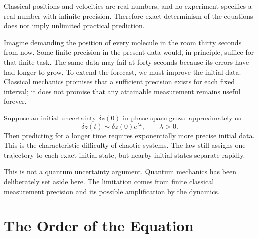 Classical positions and velocities are real numbers, and no experiment specifies a real number with infinite precision. Therefore exact determinism of the equations does not imply unlimited practical prediction.

Imagine demanding the position of every molecule in the room thirty seconds
from now. Some finite precision in the present data would, in principle,
suffice for that finite task. The same data may fail at forty seconds because
its errors have had longer to grow. To extend the forecast, we must improve
the initial data. Classical mechanics promises that a sufficient precision
exists for each fixed interval; it does not promise that any attainable
measurement remains useful forever.

Suppose an initial uncertainty \(\delta z(0)\) in phase space grows approximately as
\begin{equation}
 \delta z(t)\sim \delta z(0)e^{\lambda t},
 \qquad \lambda>0.
\end{equation}
Then predicting for a longer time requires exponentially more precise initial data. This is the characteristic difficulty of chaotic systems. The law still assigns one trajectory to each exact initial state, but nearby initial states separate rapidly.

\begin{classroomqa}

\end{classroomqa}

This is not a quantum uncertainty argument. Quantum mechanics has been deliberately set aside here. The limitation comes from finite classical measurement precision and its possible amplification by the dynamics.

\section{The Order of the Equation}

